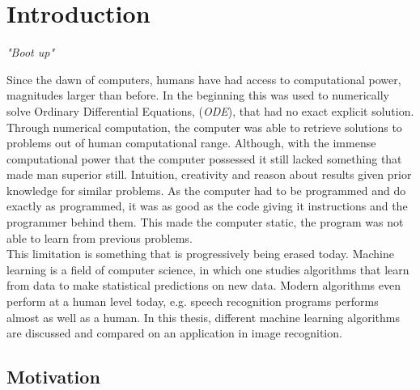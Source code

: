 \chapter{Introduction}
\begin{center}
\vspace{-6ex}
\textit{"Boot up"}
\vspace{6ex}
\end{center}

Since the dawn of computers, humans have had access to computational power, magnitudes larger than before. In the beginning this was used to numerically solve Ordinary Differential Equations, (\textit{ODE}), that had no exact explicit solution. Through numerical computation, the computer was able to retrieve solutions to problems out of human computational range. Although, with the immense computational power that the computer possessed it still lacked something that made man superior still. Intuition, creativity and reason about results given prior knowledge for similar problems. As the computer had to be programmed and do exactly as programmed, it was as good as the code giving it instructions and the programmer behind them. This made the computer static, the program was not able to learn from previous problems.\\

This limitation is something that is progressively being erased today. Machine learning is a field of computer science, in which one studies algorithms that learn from data to make statistical predictions on new data. Modern algorithms even perform at a human level today, e.g. speech recognition programs performs almost as well as a human\cite{google}.  In this thesis, different machine learning algorithms are discussed and compared on an application in image recognition.

\section{Motivation}

